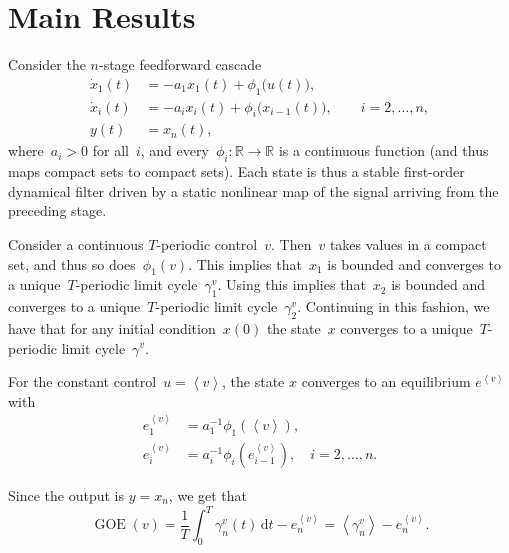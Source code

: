\documentclass[onecolumn]{IEEEtran}
\newcommand{\R}{\mathbb{R}}
\newcommand{\GOE}{\operatorname{GOE}}
\newcommand{\avg}[1]{\left\langle #1\right\rangle}
\begin{document}
\section{Main Results}\label{sec:main}
Consider the   $n$-stage feedforward cascade
\begin{align} \label{eq:cascade-general}
    \dot x_1(t)
    &=
    -a_1x_1(t)+\phi_1\bigl(u(t)\bigr),
    \nonumber\\
    \dot x_i(t)
    &=
    -a_ix_i(t)+\phi_i\bigl(x_{i-1}(t)\bigr),
    \qquad i=2,\ldots,n,
    \\
    y(t)
    &=
    x_n(t),\nonumber 
\end{align}
where~$a_i>0$  for all~$i$, and every~$\phi_i:\R\to\R$ is a continuous   function (and thus maps compact  sets to compact  sets). 
Each state is thus  a stable first-order dynamical filter driven by a
static nonlinear map of the signal arriving from the preceding
stage.

Consider a continuous $T$-periodic   control~$v$. Then~$v$ takes values in a compact set, and thus so does~$\phi_1(v)$. This implies that~$x_1 $ is bounded and converges to a unique~$T$-periodic limit cycle~$\gamma_1^v$. Using this implies that~$x_2 $ is bounded and converges to a
unique~$T$-periodic limit cycle~$\gamma_2^v$. Continuing in this fashion, we have that for any initial condition~$x(0)$ the state~$x$ converges to a 
unique~$T$-periodic limit cycle~$\gamma^v$.

 
For the constant 
control~$u=\avg{v}$, the state 
$x$ converges to an  equilibrium $e^{\avg{v}}$ with 
\begin{align*}
e_1^{\avg{ v}}& = a_1 ^{-1} \phi_1(  \avg {v}),\nonumber\\
e_i^{\avg{ v} }&= a_i ^{-1} \phi_i (
 e_{i-1}^{\avg{v}}) ,
\quad   i=2,\dots,n.
\end{align*}

Since the output is $y=x_n$, we get that   
\begin{equation}
    \GOE(v)
    =
    \frac{1}{T}
    \int_{0}^{T}\gamma_n^v(t)\,\mathrm{d}t
    -
    e_n^{\avg{ v}}
    =
    \avg{\gamma_n^v}
    -
    e_n^{\avg{ v}}.
    \label{eq:intro-cascade-goe}
\end{equation}
\end{document}
